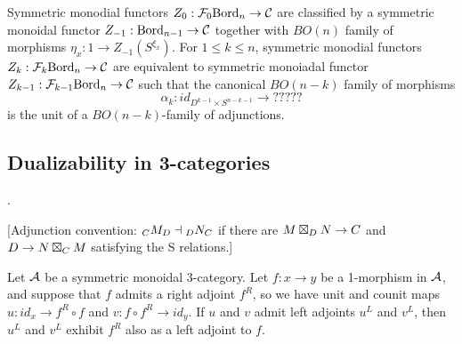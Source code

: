 \documentclass{amsart}
\begin{document}
\begin{theorem}
	Symmetric monodial functors $Z_0: \mathcal F_{0}\mathrm{Bord}_n \to \mathcal C$ are classified by a symmetric monoidal functor $Z_{-1}:\mathrm{Bord}_{n-1} \to \mathcal C$ together with $BO(n)$ family of morphisms $\eta_x: 1 \to Z_{-1}(S^{\xi_x})$. For $1 \leq k \leq n$, symmetric monodial functors $Z_k: \mathcal F_{k}\mathrm{Bord}_n \to \mathcal C$ are equivalent to symmetric monoiadal functor $Z_{k-1}: \mathcal F_{k-1}\mathrm{Bord}_n \to \mathcal C $ such that the canonical $BO(n-k)$ family of morphisms 
	\begin{equation*}
		\alpha_k: id_{D^{k-1} \times S^{n-k -1}} \to ?????
	\end{equation*}
	is the unit of a $BO(n-k)$-family of adjunctions. 
\end{theorem}


\subsection{Dualizability in 3-categories} \label{sec-lft-dual}
.



[Adjunction convention: ${}_{C} {M}_{D} \dashv  {}_{D} {N}_{C}$ if there are $M \boxtimes_D N \rightarrow C$ and $D \rightarrow N \boxtimes_C M$ satisfying the S relations.] 




\begin{proposition} \label{prop-ambiadjoints}
	Let $\mathcal A$ be a symmetric monoidal 3-category. Let $f: x \to y$ be a 1-morphism in $\mathcal A$, and suppose that $f$ admits a right adjoint $f^R$,  so we have unit and counit maps $u:id_x \to f^R \circ f$ and $v:f \circ f^R \to id_y$. If $u$ and $v$ admit left adjoints $u^L$ and $v^L$, then $u^L$ and $v^L$ exhibit $f^R$ also as a left adjoint to $f$. 
\end{proposition}
\end{document}
